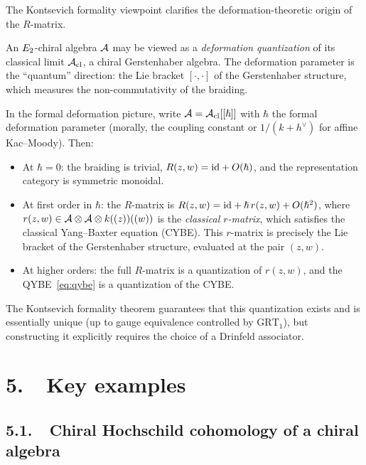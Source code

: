 The Kontsevich formality viewpoint clarifies the deformation-theoretic
origin of the $R$-matrix.

An $E_2$-chiral algebra $\mathcal{A}$ may be viewed as a \emph{deformation
quantization} of its classical limit $\mathcal{A}_{\mathrm{cl}}$, a
chiral Gerstenhaber algebra. The deformation parameter is the
``quantum'' direction: the Lie bracket $[\cdot, \cdot]$ of the
Gerstenhaber structure, which measures the non-commutativity of the
braiding.

In the formal deformation picture, write $\mathcal{A} = \mathcal{A}_{\mathrm{cl}}[[\hslash]]$
with $\hbar$ the formal deformation parameter (morally, the coupling
constant or $1/(k + h^\vee)$ for affine Kac--Moody). Then:
\begin{itemize}
 \item At $\hbar = 0$: the braiding is trivial,
 $R(z,w) = \mathrm{id} + O(\hslash)$, and the representation category is
 symmetric monoidal.
 \item At first order in $\hbar$: the $R$-matrix is
 $R(z,w) = \mathrm{id} + \hslash\, r(z,w) + O(\hslash^2)$, where
 $r(z,w) \in \mathcal{A} \otimes \mathcal{A} \otimes k((z))((w))$ is the
 \emph{classical $r$-matrix}, which satisfies the classical
 Yang--Baxter equation (CYBE). This $r$-matrix is precisely the
 Lie bracket of the Gerstenhaber structure, evaluated at the
 pair $(z,w)$.
 \item At higher orders: the full $R$-matrix is a quantization of
 $r(z,w)$, and the QYBE~\eqref{eq:qybe} is a quantization of the
 CYBE.
\end{itemize}

The Kontsevich formality theorem guarantees that this quantization
exists and is essentially unique (up to gauge equivalence controlled
by $\mathrm{GRT}_1$), but constructing it explicitly requires
the choice of a Drinfeld associator.



\section*{5.\ \ Key examples}
\label{note:sec:examples}

\subsection*{5.1.\ \ Chiral Hochschild cohomology of a chiral algebra}


